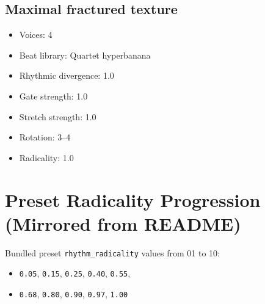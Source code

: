 \documentclass[11pt,a4paper]{article}
\begin{document}
\subsection*{Maximal fractured texture}
\begin{itemize}
  \item Voices: 4
  \item Beat library: Quartet hyperbanana
  \item Rhythmic divergence: 1.0
  \item Gate strength: 1.0
  \item Stretch strength: 1.0
  \item Rotation: 3--4
  \item Radicality: 1.0
\end{itemize}

\section{Preset Radicality Progression (Mirrored from README)}
Bundled preset \texttt{rhythm\_radicality} values from 01 to 10:
\begin{itemize}
  \item \texttt{0.05}, \texttt{0.15}, \texttt{0.25}, \texttt{0.40}, \texttt{0.55},
  \item \texttt{0.68}, \texttt{0.80}, \texttt{0.90}, \texttt{0.97}, \texttt{1.00}
\end{itemize}
\end{document}
